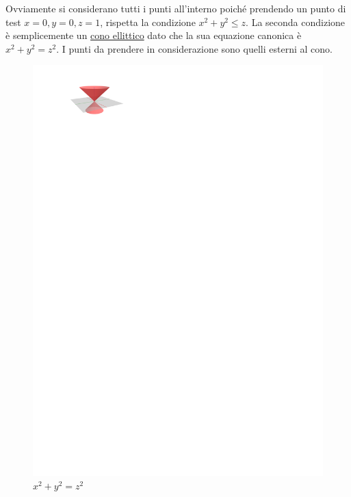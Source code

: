 \documentclass[a4paper]{article}
\begin{document}
	\noindent
	Ovviamente si considerano tutti i punti all'interno poiché prendendo un punto di test $x=0,y=0, z=1$, rispetta la condizione $x^{2}+y^{2}\le z$. La seconda condizione è semplicemente un \href{https://en.wikipedia.org/wiki/Cone#Elliptic_cone}{cono ellittico} dato che la sua equazione canonica è $x^{2} + y^{2} = z^{2}$. I punti da prendere in considerazione sono quelli esterni al cono.
	\begin{figure}[!htp]
		\centering
		\includegraphics[width=.7\textwidth]{img/integrazione_per_fili_2.pdf}
		\caption{$x^{2}+y^{2} = z^{2}$}
	\end{figure}\newpage
\end{document}
